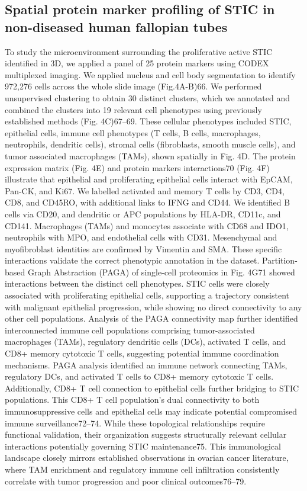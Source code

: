 \begin{refsection}
    \subsection{Spatial protein marker profiling of STIC in non-diseased human fallopian tubes}
    To study the microenvironment surrounding the proliferative active STIC identified in 3D, we applied a panel of 25 protein markers using CODEX multiplexed imaging. We applied nucleus and cell body segmentation to identify 972,276 cells across the whole slide image (Fig.4A-B)66. We performed unsupervised clustering to obtain 30 distinct clusters, which we annotated and combined the clusters into 19 relevant cell phenotypes using previously established methods (Fig. 4C)67–69. These cellular phenotypes included STIC, epithelial cells, immune cell phenotypes (T cells, B cells, macrophages, neutrophils, dendritic cells), stromal cells (fibroblasts, smooth muscle cells), and tumor associated macrophages (TAMs), shown spatially in Fig. 4D. The protein expression matrix (Fig. 4E) and protein markers interactions70 (Fig. 4F) illustrate that epithelial and proliferating epithelial cells interact with EpCAM, Pan-CK, and Ki67. We labelled activated and memory T cells by CD3, CD4, CD8, and CD45RO, with additional links to IFNG and CD44. We identified B cells via CD20, and dendritic or APC populations by HLA-DR, CD11c, and CD141. Macrophages (TAMs) and monocytes associate with CD68 and IDO1, neutrophils with MPO, and endothelial cells with CD31. Mesenchymal and myofibroblast identities are confirmed by Vimentin and SMA. These specific interactions validate the correct phenotypic annotation in the dataset.
    Partition-based Graph Abstraction (PAGA) of single-cell proteomics in Fig. 4G71 showed interactions between the distinct cell phenotypes. STIC cells were closely associated with proliferating epithelial cells, supporting a trajectory consistent with malignant epithelial progression, while showing no direct connectivity to any other cell populations. Analysis of the PAGA connectivity map further identified interconnected immune cell populations comprising tumor-associated macrophages (TAMs), regulatory dendritic cells (DCs), activated T cells, and CD8+ memory cytotoxic T cells, suggesting potential immune coordination mechanisms. 
    PAGA analysis identified an immune network connecting TAMs, regulatory DCs, and activated T cells to CD8+ memory cytotoxic T cells. Additionally, CD8+ T cell connection to epithelial cells further bridging to STIC populations. This CD8+ T cell population's dual connectivity to both immunosuppressive cells and epithelial cells may indicate potential compromised immune surveillance72–74. While these topological relationships require functional validation, their organization suggests structurally relevant cellular interactions potentially governing STIC maintenance75. This immunological landscape closely mirrors established observations in ovarian cancer literature, where TAM enrichment and regulatory immune cell infiltration consistently correlate with tumor progression and poor clinical outcomes76–79. 

\end{refsection}
